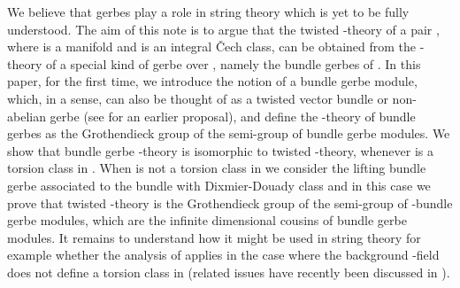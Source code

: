 \documentclass[a4paper,reqno]{amsart}
\theoremstyle{plain}
\theoremstyle{definition}
\theoremstyle{remark}
\numberwithin{equation}{section}
\numberwithin{figure}{section}
\providecommand{\cH}{{\mathcal H}}
\providecommand{\ZZ}{{\mathbb Z}}
\providecommand{\UK}{U{_\mathcal K}}
\providecommand{\<}{\langle}
\renewcommand{\>}{\rangle}
\begin{document}
We believe that gerbes play a role in string theory which is yet to be
fully understood. The aim of this note is to argue that the twisted
\coordHE{}-theory of a pair \coordHE{}, where \coordHE{} is a manifold and \myHighlight{$[H]$}\coordHE{} is
an integral \v Cech class, can be obtained from the
\coordHE{}-theory of a special kind of gerbe over \coordHE{}, namely the bundle
gerbes of \cite{Mur}.  In this paper, for the
first time, we introduce the notion of a bundle gerbe
module, which, in a sense, can also be thought of as a twisted
vector bundle or non-abelian gerbe (see \cite{Kalk} for an
earlier proposal), and define the \coordHE{}-theory of bundle gerbes as
the Grothendieck group of the semi-group of bundle gerbe modules.
We show that bundle gerbe \coordHE{}-theory is isomorphic
to twisted \coordHE{}-theory, whenever \myHighlight{$[H]$}\coordHE{} is a torsion class in \coordHE{}.
When \myHighlight{$[H]$}\coordHE{} is not a torsion class in \coordHE{} we consider the
lifting bundle gerbe associated to the \myHighlight{$PU(\cH)$}\coordHE{} bundle with Dixmier-Douady
class \myHighlight{$[H]$}\coordHE{} and in this case we prove
that twisted \coordHE{}-theory
is the Grothendieck group of the semi-group of  \myHighlight{$\UK$}\coordHE{}-bundle gerbe modules,
which are the infinite dimensional cousins of bundle gerbe modules.
   It remains to understand how it might be used in string theory for
example whether the analysis of
\cite{FW} applies in the case where the background \coordHE{}-field does not
define a torsion class in
\myHighlight{$H^3(M,\ZZ)$}\coordHE{} (related issues have recently been discussed in 
\cite{MalMooSei}).
\end{document}
